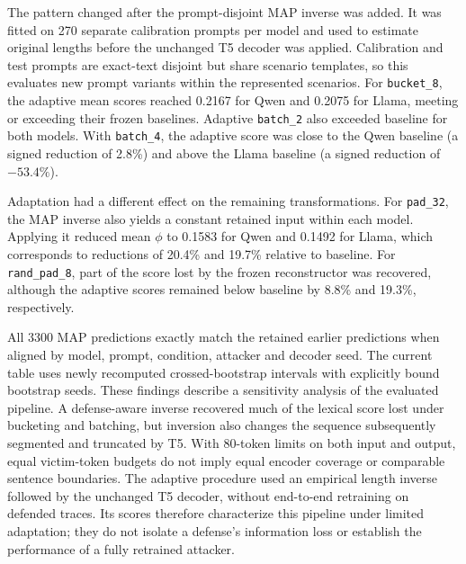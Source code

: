\documentclass[electronics,article,submit,pdftex,moreauthors]{Definitions/mdpi}
\begin{document}
The pattern changed after the prompt-disjoint MAP inverse was added. It was fitted on 270 separate calibration prompts per model and used to estimate original lengths before the unchanged T5 decoder was applied. Calibration and test prompts are exact-text disjoint but share scenario templates, so this evaluates new prompt variants within the represented scenarios. For \texttt{bucket\_8}, the adaptive mean scores reached 0.2167 for Qwen and 0.2075 for Llama, meeting or exceeding their frozen baselines. Adaptive \texttt{batch\_2} also exceeded baseline for both models. With \texttt{batch\_4}, the adaptive score was close to the Qwen baseline (a signed reduction of 2.8\%) and above the Llama baseline (a signed reduction of $-53.4\%$).

Adaptation had a different effect on the remaining transformations. For \texttt{pad\_32}, the MAP inverse also yields a constant retained input within each model. Applying it reduced mean $\phi$ to 0.1583 for Qwen and 0.1492 for Llama, which corresponds to reductions of 20.4\% and 19.7\% relative to baseline. For \texttt{rand\_pad\_8}, part of the score lost by the frozen reconstructor was recovered, although the adaptive scores remained below baseline by 8.8\% and 19.3\%, respectively.

All 3300 MAP predictions exactly match the retained earlier predictions when aligned by model, prompt, condition, attacker and decoder seed. The current table uses newly recomputed crossed-bootstrap intervals with explicitly bound bootstrap seeds. These findings describe a sensitivity analysis of the evaluated pipeline. A defense-aware inverse recovered much of the lexical score lost under bucketing and batching, but inversion also changes the sequence subsequently segmented and truncated by T5. With 80-token limits on both input and output, equal victim-token budgets do not imply equal encoder coverage or comparable sentence boundaries. The adaptive procedure used an empirical length inverse followed by the unchanged T5 decoder, without end-to-end retraining on defended traces. Its scores therefore characterize this pipeline under limited adaptation; they do not isolate a defense's information loss or establish the performance of a fully retrained attacker.
\end{document}
